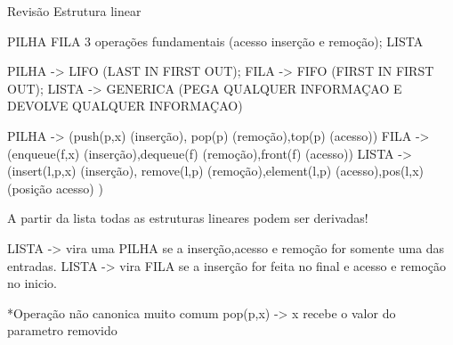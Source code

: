 Revisão
Estrutura linear

PILHA
FILA        3 operações fundamentais (acesso inserção e remoção);
LISTA     

PILHA -> LIFO (LAST IN FIRST OUT);
FILA -> FIFO (FIRST IN FIRST OUT);
LISTA -> GENERICA (PEGA QUALQUER INFORMAÇAO E DEVOLVE QUALQUER INFORMAÇAO)

PILHA -> (push(p,x) (inserção), pop(p) (remoção),top(p) (acesso))
FILA -> (enqueue(f,x) (inserção),dequeue(f) (remoção),front(f) (acesso))
LISTA -> (insert(l,p,x) (inserção), remove(l,p) (remoção),element(l,p) (acesso),pos(l,x) (posição acesso) )

A partir da lista todas as estruturas lineares podem ser derivadas!

LISTA -> vira uma PILHA se a inserção,acesso e remoção for somente uma das entradas.
LISTA -> vira FILA se a inserção for feita no final e acesso e remoção no inicio.

*Operação não canonica muito comum pop(p,x) -> x recebe o valor do parametro removido